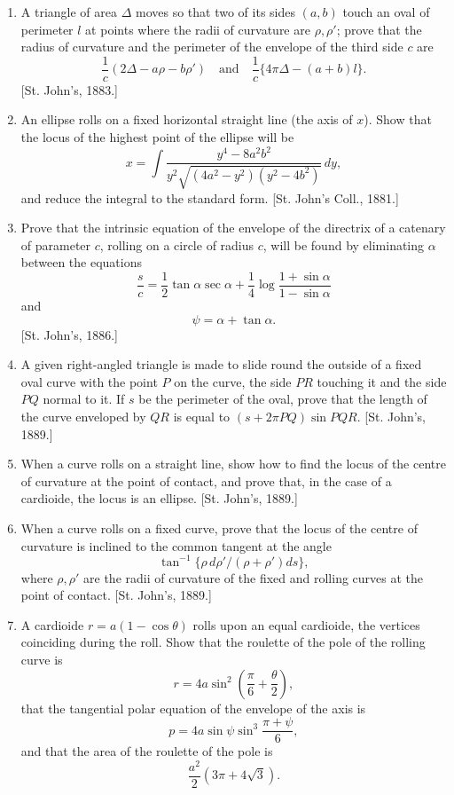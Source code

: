 \documentclass[11pt, a4paper]{article}
\newcommand{\source}[1]{\hfill\textnormal{[#1]}}
\begin{document}
\begin{enumerate}[leftmargin=2em]
\item A triangle of area $\Delta$ moves so that two of its sides $(a,b)$ touch an oval of perimeter $l$ at points where the radii of curvature are $\rho,\rho'$; prove that the radius of curvature and the perimeter of the envelope of the third side $c$ are
\[
\frac{1}{c}(2\Delta-a\rho-b\rho')\quad\text{and}\quad\frac{1}{c}\{4\pi\Delta-(a+b)l\}.
\]
\source{St. John's, 1883.}

\item An ellipse rolls on a fixed horizontal straight line (the axis of $x$). Show that the locus of the highest point of the ellipse will be
\[
x=\int\frac{y^4-8a^2b^2}{y^2\sqrt{(4a^2-y^2)(y^2-4b^2)}}\,dy,
\]
and reduce the integral to the standard form. \source{St. John's Coll., 1881.}

\item Prove that the intrinsic equation of the envelope of the directrix of a catenary of parameter $c$, rolling on a circle of radius $c$, will be found by eliminating $\alpha$ between the equations
\[
\frac{s}{c}=\frac12\tan\alpha\sec\alpha+\frac14\log\frac{1+\sin\alpha}{1-\sin\alpha}
\]
and
\[
\psi=\alpha+\tan\alpha.
\]
\source{St. John's, 1886.}

\item A given right-angled triangle is made to slide round the outside of a fixed oval curve with the point $P$ on the curve, the side $PR$ touching it and the side $PQ$ normal to it. If $s$ be the perimeter of the oval, prove that the length of the curve enveloped by $QR$ is equal to $(s+2\pi PQ)\sin PQR$. \source{St. John's, 1889.}

\item When a curve rolls on a straight line, show how to find the locus of the centre of curvature at the point of contact, and prove that, in the case of a cardioide, the locus is an ellipse. \source{St. John's, 1889.}

\item When a curve rolls on a fixed curve, prove that the locus of the centre of curvature is inclined to the common tangent at the angle
\[
\tan^{-1}\{\rho\,d\rho'/(\rho+\rho')ds\},
\]
where $\rho,\rho'$ are the radii of curvature of the fixed and rolling curves at the point of contact. \source{St. John's, 1889.}

\item A cardioide $r=a(1-\cos\theta)$ rolls upon an equal cardioide, the vertices coinciding during the roll. Show that the roulette of the pole of the rolling curve is
\[
r=4a\sin^2\left(\frac{\pi}{6}+\frac{\theta}{2}\right),
\]
that the tangential polar equation of the envelope of the axis is
\[
p=4a\sin\psi\sin^3\frac{\pi+\psi}{6},
\]
and that the area of the roulette of the pole is
\[
\frac{a^2}{2}(3\pi+4\sqrt3).
\]


\end{enumerate}
\end{document}
